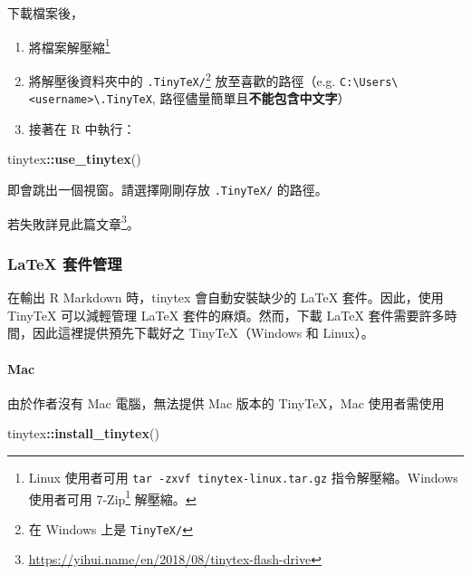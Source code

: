 \documentclass[oneside]{book}
\newenvironment{Shaded}{\begin{snugshade}}{\end{snugshade}}
\newcommand{\KeywordTok}[1]{\textcolor[rgb]{0.13,0.29,0.53}{\textbf{#1}}}
\newcommand{\NormalTok}[1]{#1}
\newcommand{\OperatorTok}[1]{\textcolor[rgb]{0.81,0.36,0.00}{\textbf{#1}}}
\renewcommand{\href}[2]{#2\footnote{\url{#1}}}
\theoremstyle{definition}
\theoremstyle{definition}
\theoremstyle{definition}
\theoremstyle{remark}
\begin{document}
下載檔案後，

\begin{enumerate}
\def\labelenumi{\alph{enumi})}
\item
  將檔案解壓縮\footnote{Linux 使用者可用 \texttt{tar\ -zxvf\ tinytex-linux.tar.gz} 指令解壓縮。Windows 使用者可用 \href{https://www.developershome.com/7-zip/}{7-Zip} 解壓縮。}
\item
  將解壓後資料夾中的 \texttt{.TinyTeX/}\footnote{在 Windows 上是 \texttt{TinyTeX/}} 放至喜歡的路徑（e.g. \texttt{C:\textbackslash{}Users\textbackslash{}\textless{}username\textgreater{}\textbackslash{}.TinyTeX}, 路徑儘量簡單且\textbf{不能包含中文字}）
\item
  接著在 R 中執行：
\end{enumerate}

\begin{Shaded}
\begin{Highlighting}[]
\NormalTok{tinytex}\OperatorTok{::}\KeywordTok{use_tinytex}\NormalTok{()}
\end{Highlighting}
\end{Shaded}

即會跳出一個視窗。請選擇剛剛存放 \texttt{.TinyTeX/} 的路徑。

若失敗詳見\href{https://yihui.name/en/2018/08/tinytex-flash-drive}{此篇文章}。

\hypertarget{tinytex-manage}{%
\subsubsection{LaTeX 套件管理}\label{tinytex-manage}}

在輸出 R Markdown 時，tinytex 會自動安裝缺少的 LaTeX 套件。因此，使用 TinyTeX 可以減輕管理 LaTeX 套件的麻煩。然而，下載 LaTeX 套件需要許多時間，因此這裡提供預先下載好之 TinyTeX（Windows 和 Linux）。

\hypertarget{mac}{%
\paragraph{Mac}\label{mac}}

由於作者沒有 Mac 電腦，無法提供 Mac 版本的 TinyTeX，Mac 使用者需使用

\begin{Shaded}
\begin{Highlighting}[]
\NormalTok{tinytex}\OperatorTok{::}\KeywordTok{install_tinytex}\NormalTok{()}
\end{Highlighting}
\end{Shaded}
\end{document}
